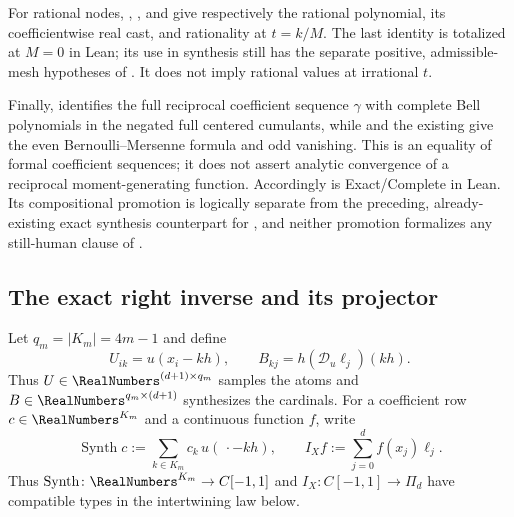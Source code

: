 For rational nodes,
,
, and
 give respectively the rational
polynomial, its coefficientwise real cast, and rationality at $t=k/M$.
The last identity is totalized at $M=0$ in Lean; its use in synthesis still
has the separate positive, admissible-mesh hypotheses of
.  It does not imply rational values at irrational
$t$.

Finally,
identifies the full reciprocal coefficient sequence $\gamma$ with complete
Bell polynomials in the negated full centered cumulants, while
 and the
existing  give the even
Bernoulli--Mersenne formula and odd vanishing.  This is an equality of formal
coefficient sequences; it does not assert analytic convergence of a
reciprocal moment-generating function.  Accordingly
 is Exact/Complete in Lean.  Its compositional
promotion is logically separate from the preceding, already-existing exact
synthesis counterpart for , and neither promotion
formalizes any still-human clause of .

\subsection{The exact right inverse and its projector}

Let $q_m=|K_m|=4m-1$ and define
\begin{equation}
 U_{ik}=u(x_i-kh),
 \qquad
 B_{kj}=h(\mathscr D_u\ell_j)(kh).
 \label{eq:lag-UB}
\end{equation}
Thus $U\in\RealNumbers^{(d+1)\times q_m}$ samples the atoms and
$B\in\RealNumbers^{q_m\times(d+1)}$ synthesizes the cardinals.
For a coefficient row $c\in\RealNumbers^{K_m}$ and a continuous function $f$, write
\[
 \operatorname{Synth}c:=\sum_{k\in K_m}c_k\,u(\,\cdot-kh),
 \qquad
 I_Xf:=\sum_{j=0}^{d}f(x_j)\ell_j.
\]
Thus $\operatorname{Synth}\colon\RealNumbers^{K_m}\to C[-1,1]$ and
$I_X\colon C[-1,1]\to\Pi_d$ have compatible types in the intertwining law
below.

